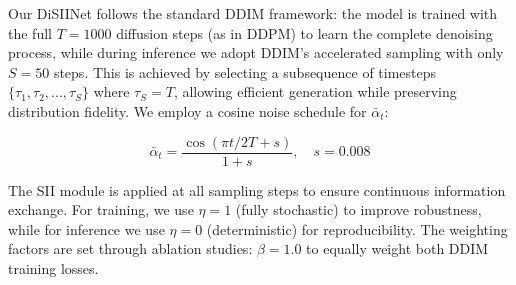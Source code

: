 \documentclass{article}
\begin{document}
Our DiSIINet follows the standard DDIM framework: the model is trained with the full $T=1000$ diffusion steps (as in DDPM) to learn the complete denoising process, while during inference we adopt DDIM's accelerated sampling with only $S=50$ steps. This is achieved by selecting a subsequence of timesteps $\{\tau_1, \tau_2, ..., \tau_S\}$ where $\tau_S = T$, allowing efficient generation while preserving distribution fidelity. We employ a cosine noise schedule \cite{nichol2021improved} for $\bar{\alpha}_t$:

\begin{equation}
\bar{\alpha}_t = \frac{\cos(\pi t/2T + s)}{1 + s}, \quad s = 0.008
\end{equation}

The SII module is applied at all sampling steps to ensure continuous information exchange. For training, we use $\eta=1$ (fully stochastic) to improve robustness, while for inference we use $\eta=0$ (deterministic) for reproducibility. The weighting factors are set through ablation studies: $\beta=1.0$ to equally weight both DDIM training losses. 
\end{document}

